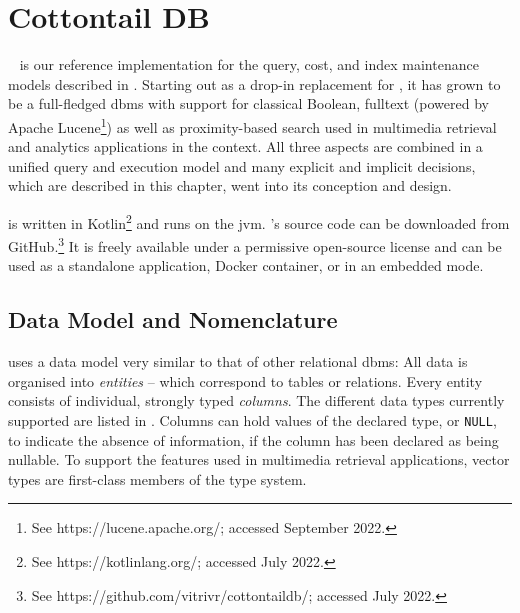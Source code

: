 \chapter{Cottontail DB}

\label{chapter:cottontaildb}

\cottontail{}~\cite{Gasser:2020Cottontail} is our reference implementation for the query, cost, and index maintenance models described in . Starting out as a drop-in replacement for \adampro{} \cite{Giangreco:2016Adam}, it has grown to be a full-fledged \acrshort{dbms} with support for classical Boolean, fulltext (powered by Apache Lucene\footnote{See https://lucene.apache.org/; accessed September 2022.}) as well as proximity-based search used in multimedia retrieval and analytics applications in the \vitrivr{} \cite{Rossetto:2016Vitrivr,Gasser:2019Multimodal} context. All three aspects are combined in a unified query and execution model and many explicit and implicit decisions, which are described in this chapter, went into its conception and design.

\cottontail{} is written in Kotlin\footnote{See https://kotlinlang.org/; accessed July 2022.} and runs on the \acrfull{jvm}. \cottontail{}'s source code can be downloaded from GitHub.\footnote{See https://github.com/vitrivr/cottontaildb/; accessed July 2022.} It is freely available under a permissive open-source license and can be used as a standalone application, Docker container, or in an embedded mode.

\section{Data Model and Nomenclature} 

\cottontail{} uses a data model very similar to that of other relational \acrshort{dbms}: All data is organised into \emph{entities} -- which correspond to tables or relations. Every entity consists of individual, strongly typed \emph{columns}. The different data types currently supported are listed in . Columns can hold values of the declared type, or \texttt{NULL}, to indicate the absence of information, if the column has been declared as being nullable. To support the features used in multimedia retrieval applications, vector types are first-class members of the type system.

